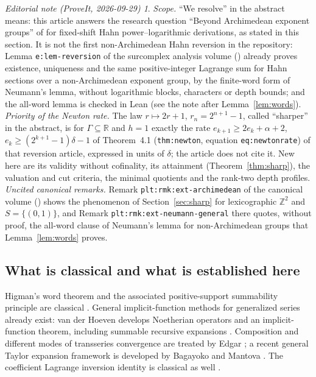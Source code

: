 \documentclass[11pt,a4paper]{article}
\theoremstyle{definition}
\theoremstyle{remark}
\newtheorem*{ednote}{Editorial note (ProveIt, 2026-09-29)}
\newcommand{\Z}{\mathbb Z}
\newcommand{\R}{\mathbb R}
\begin{document}
\begin{ednote}\label{ed:scope}
\emph{Scope.} ``We resolve'' in the abstract means: this article answers the research
question ``Beyond Archimedean exponent groups'' of
for fixed-shift Hahn power--logarithmic derivations, as stated in this
section. It is not the first non-Archimedean Hahn
reversion in the repository: Lemma \texttt{e:lem-reversion} of the
surcomplex analysis volume \cite{EdSurcomplex}
()
already proves existence, uniqueness and the same positive-integer
Lagrange sum for Hahn sections over a non-Archimedean exponent group, by
the finite-word form of Neumann's lemma, without logarithmic blocks,
characters or depth bounds; and the all-word lemma is checked in Lean
(see the note after Lemma~\ref{lem:words}).
\emph{Priority of the Newton rate.} The law $r\mapsto2r+1$,
$r_n=2^{n+1}-1$, called ``sharper'' in the abstract, is for $\Gamma\subseteq\R$ and
$h=1$ exactly the rate $e_{k+1}\ge2e_k+\alpha+2$,
$e_k\ge(2^{k+1}-1)\delta-1$ of Theorem~4.1 (\texttt{thm:newton},
equation \texttt{eq:newtonrate}) of that reversion article, expressed in
units of $\delta$; the article does not cite it. New here are its
validity without cofinality, its attainment (Theorem~\ref{thm:sharp}),
the valuation and cut criteria, the minimal quotients and the rank-two
depth profiles.
\emph{Uncited canonical remarks.} Remark
\texttt{plt:rmk:ext-archimedean} of the canonical volume
()
shows the phenomenon of Section~\ref{sec:sharp} for lexicographic
$\Z^2$ and $S=\{(0,1)\}$, and Remark \texttt{plt:rmk:ext-neumann-general}
there quotes, without proof, the all-word clause of Neumann's lemma for
non-Archimedean groups that Lemma~\ref{lem:words} proves.
\end{ednote}

\subsection{What is classical and what is established here}
Higman's word theorem and the associated positive-support summability
principle are classical \cite{Higman}. General implicit-function methods
for generalized series already exist: van der Hoeven develops Noetherian
operators and an implicit-function theorem, including summable recursive
expansions \cite{vdH}. Composition and different modes of transseries
convergence are treated by Edgar \cite{Edgar}; a recent general Taylor
expansion framework is developed by Bagayoko and Mantova \cite{BM}.
The coefficient Lagrange inversion identity is classical as well
\cite{Gessel}.
\end{document}
